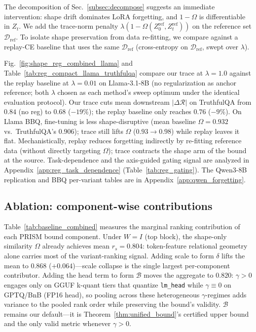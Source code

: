\documentclass{article}
\begin{document}


The decomposition of Sec.~\ref{subsec:decompose} suggests an immediate intervention: shape drift dominates LoRA forgetting, and $1{-}\Omega$ is differentiable in $Z_t$. We add the trace-norm penalty $\lambda(1{-}\Omega(Z_0^{\mathrm{ref}}, Z_t^{\mathrm{ref}}))$ on the reference set $\mathcal{D}_{\mathrm{ref}}$. To isolate shape preservation from data re-fitting, we compare against a replay-CE baseline that uses the same $\mathcal{D}_{\mathrm{ref}}$ (cross-entropy on $\mathcal{D}_{\mathrm{ref}}$, swept over $\lambda$).

Fig.~\ref{fig:shape_reg_combined_llama} and Table~\ref{tab:reg_compact_llama_truthfulqa} compare our trace at $\lambda{=}1.0$ against the replay baseline at $\lambda{=}0.01$ on Llama-3.1-8B (no regularization as anchor reference; both $\lambda$ chosen as each method's sweep optimum under the identical evaluation protocol). Our trace cuts mean downstream $|\Delta\mathcal{R}|$ on TruthfulQA from $0.84$ (no reg) to $0.68$ ($-19\%$); the replay baseline only reaches $0.76$ ($-9\%$). On Llama BBQ, fine-tuning is less shape-disruptive (mean baseline $\Omega = 0.932$ vs.\ TruthfulQA's $0.906$); trace still lifts $\Omega$ ($0.93 \to 0.98$) while replay leaves it flat. Mechanistically, replay reduces forgetting indirectly by re-fitting reference data (without directly targeting $\Omega$); trace contracts the shape arm of the bound at the source. Task-dependence and the axis-guided gating signal are analyzed in Appendix~\ref{app:reg_task_dependence} (Table~\ref{tab:reg_gating}). The Qwen3-8B replication and BBQ per-variant tables are in Appendix~\ref{app:qwen_forgetting}.


\subsection{Ablation: component-wise contributions}
\label{subsec:ablation}



Table~\ref{tab:baseline_combined} measures the marginal ranking contribution of each PRISM bound component. Under $W{=}I$ (top block), the shape-only similarity $\Omega$ already achieves mean $r_s{=}0.804$: token-feature relational geometry alone carries most of the variant-ranking signal. Adding scale to form $\delta$ lifts the mean to $0.868$ ($+0.064$)---scale collapse is the single largest per-component contributor. Adding the head term to form $\mathcal{B}$ moves the aggregate to $0.820$: $\gamma{>}0$ engages only on GGUF k-quant tiers that quantize \texttt{lm\_head} while $\gamma{\equiv}0$ on GPTQ/BnB (FP16 head), so pooling across these heterogeneous $\gamma$-regimes adds variance to the pooled rank order while preserving the bound's validity. $\mathcal{B}$ remains our default---it is Theorem~\ref{thm:unified_bound}'s certified upper bound and the only valid metric whenever $\gamma{>}0$.
\end{document}
